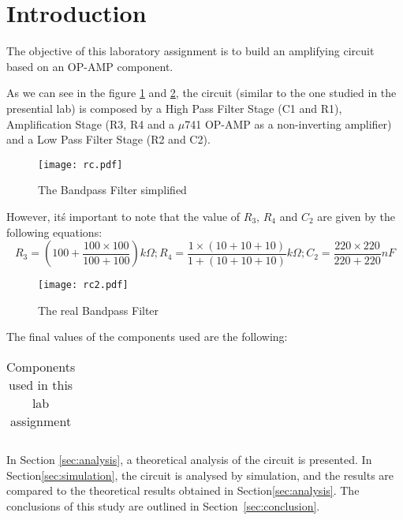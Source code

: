 \section{Introduction}
\label{sec:introduction}

The objective of this laboratory assignment is to build an amplifying circuit based on an OP-AMP component.

As we can see in the figure \ref{fig:rc} and \ref{fig:rc2}, the circuit (similar to the one studied in the presential lab) is composed by a High Pass Filter Stage (C1 and R1), Amplification Stage (R3, R4 and a $\mu$741 OP-AMP as a non-inverting amplifier) and a Low Pass Filter Stage (R2 and C2).

\begin{figure}[h] \centering
\texttt{[image: rc.pdf]}
\vspace{-5mm}
\caption{The Bandpass Filter simplified}\label{fig:rc}
\end{figure}

However, itś important to note that the value of $R_3$, $R_4$ and $C_2$ are given by the following equations:
\begin{equation}
 R_3= (100+ \frac{100\times100}{100+100}) k\Omega;     
 R_4= \frac{1\times(10+10+10)}{1+(10+10+10)} k\Omega;     
 C_2=\frac{220\times220}{220+220} nF
 \end{equation}

\begin{figure}[h] \centering
\texttt{[image: rc2.pdf]}
\vspace{-5mm}
\caption{The real Bandpass Filter }\label{fig:rc2}
\end{figure}

The final values of the components used are the following:

\begin{table}[!htb]
\centering
  \begin{tabular}{|c|c|}
    \hline    
    
 \end{tabular}
 \caption{Components used in this lab assignment}\label{tab:components}
\end{table}


In Section \ref{sec:analysis}, a theoretical analysis of the circuit is presented. In Section\ref{sec:simulation}, the circuit is analysed by simulation, and the results are compared to the theoretical results obtained in Section\ref{sec:analysis}. The conclusions of this study are outlined in Section~\ref{sec:conclusion}.






